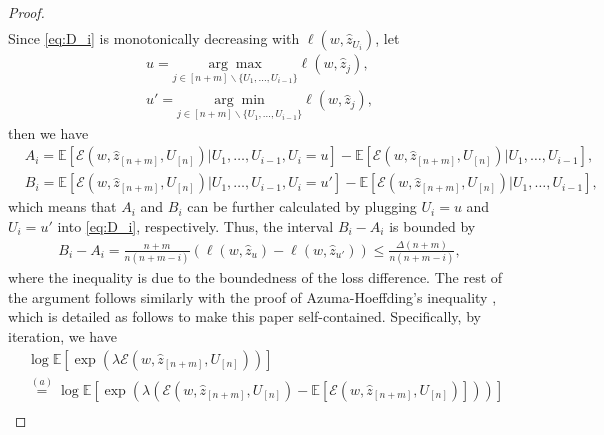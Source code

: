 \documentclass[onecolumn,romanappendices,10pt]{IEEEtran}
\newcommand{\Ecal}{{\mathcal E}}
\newcommand{\EE}{{\mathbb{E}}}
\begin{document}
\begin{proof}
\begin{equation}
\begin{aligned}
			\end{aligned}
		\end{equation}
		Since \eqref{eq:D_i} is monotonically decreasing with $\ell(w, \hat{z}_{U_i})$, let
		\begin{equation*}
			\begin{aligned}
				u = \underset{j \in [n+m]\backslash \{U_1, \ldots, U_{i-1}\}}{\arg\max} \ell(w, \hat{z}_j), \\
				u' = \underset{j \in [n+m]\backslash \{U_1, \ldots, U_{i-1}\}}{\arg\min} \ell(w, \hat{z}_j),
			\end{aligned}
		\end{equation*}
		then we have
		\begin{equation}
			\begin{aligned}
				&A_i = \EE \left[ \Ecal\left( w, \hat{z}_{[n+m]}, U_{[n]} \right) | U_1, \ldots, U_{i-1}, U_i = u \right] - \EE \left[ \Ecal\left( w, \hat{z}_{[n+m]}, U_{[n]} \right) | U_1, \ldots, U_{i-1} \right], \\
				&B_i = \EE \left[ \Ecal\left( w, \hat{z}_{[n+m]}, U_{[n]} \right) | U_1, \ldots, U_{i-1}, U_i = u' \right] - \EE \left[ \Ecal\left( w, \hat{z}_{[n+m]}, U_{[n]} \right) | U_1, \ldots, U_{i-1} \right],
			\end{aligned}
		\end{equation}
		which means that $A_i$ and $B_i$ can be further calculated by plugging $U_i = u$ and $U_i = u'$ into \eqref{eq:D_i}, respectively. Thus, the interval $B_i - A_i$ is bounded by
		\begin{equation}
			\begin{aligned}
				B_i - A_i = \frac{n+m}{n(n+m-i)} \left( \ell(w, \hat{z}_{u}) - \ell(w, \hat{z}_{u'}) \right) \leq \frac{\Delta(n+m)}{n(n+m-i)},
			\end{aligned}\label{eq:interval-delta}
		\end{equation}	
		where the inequality is due to the boundedness of the loss difference. The rest of the argument follows similarly with the proof of Azuma-Hoeffding's inequality {\cite[Theorem~3.2.1]{roch2024modern}}, which is detailed as follows to make this paper self-contained. Specifically, by iteration, we have
		\begin{equation}	
			\begin{aligned}
				&\log \EE \left[ \exp \left( \lambda \Ecal\left( w, \hat{z}_{[n+m]}, U_{[n]} \right) \right) \right] \\
				&\overset{(a)}{=} \log \EE \left[ \exp \left( \lambda \left( \Ecal\left( w, \hat{z}_{[n+m]}, U_{[n]} \right) - \EE \left[ \Ecal\left( w, \hat{z}_{[n+m]}, U_{[n]} \right) \right] \right) \right) \right] \\

\end{aligned}
\end{equation}
\end{proof}
\end{document}
